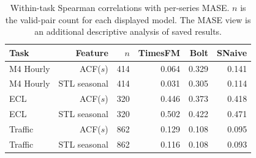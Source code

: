 \begin{table}[!htbp]
\centering
\caption{Within-task Spearman correlations with per-series MASE. $n$ is the valid-pair count for each displayed model. The MASE view is an additional descriptive analysis of saved results.}
\label{tab:corrmase}
\small
\setlength{\tabcolsep}{3.5pt}
\begin{tabular}{lrrrrr}
\hline
Task & Feature & $n$ & TimesFM & Bolt & SNaive \\
\hline
M4 Hourly & ACF($s$) & 414 & 0.064 & 0.329 & 0.141 \\
M4 Hourly & STL seasonal & 414 & 0.031 & 0.305 & 0.114 \\
ECL & ACF($s$) & 320 & 0.446 & 0.373 & 0.418 \\
ECL & STL seasonal & 320 & 0.502 & 0.422 & 0.471 \\
Traffic & ACF($s$) & 862 & 0.129 & 0.108 & 0.095 \\
Traffic & STL seasonal & 862 & 0.116 & 0.108 & 0.093 \\
\hline
\end{tabular}
\end{table}
